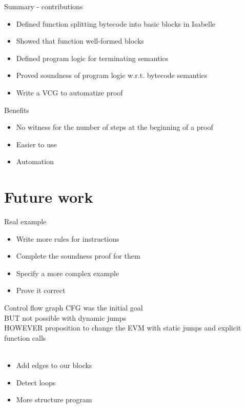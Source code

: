 \documentclass{beamer}
\begin{document}
\begin{frame}{Summary - contributions}
	\begin{itemize}
		\item Defined function splitting bytecode into basic blocks in Isabelle
		\item Showed that function well-formed blocks
		\item Defined program logic for terminating semantics
		\item Proved soundness of program logic w.r.t. bytecode semantics
		\item Write a VCG to automatize proof
	\end{itemize}
\end{frame}

\begin{frame}{Benefits}
	\begin{itemize}
		\item No witness for the number of steps at the beginning of a proof
		\item Easier to use
		\item Automation 
	\end{itemize}
\end{frame}

\part{Future work}
\frame{\partpage}

\begin{frame}{Real example}
	\begin{itemize}
		\item Write more rules for instructions
		\item Complete the soundness proof for them
		\item Specify a more complex example
		\item Prove it correct
	\end{itemize}
\end{frame}

\begin{frame}{Control flow graph}
	CFG was the initial goal\\
	BUT not possible with dynamic jumps\\
	HOWEVER proposition to change the EVM with static jumps and explicit function calls
	\\~\\
	\begin{itemize}
		\item Add edges to our blocks
		\item Detect loops
		\item More structure program
	\end{itemize}
\end{frame}




\end{document}
